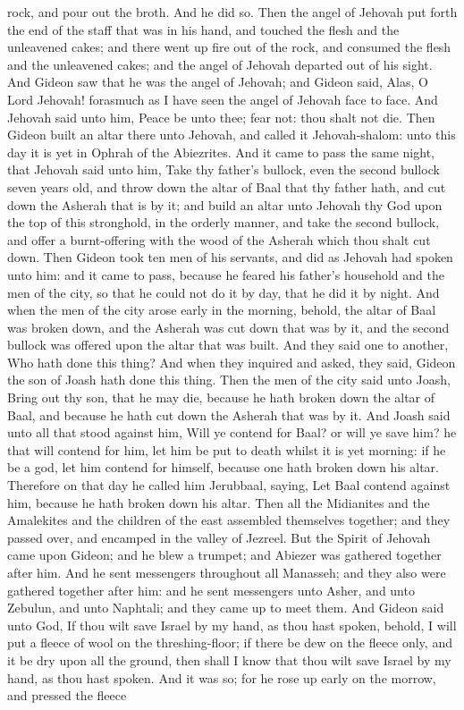 rock, and pour out the broth. And he did so. Then the angel of Jehovah put forth the end of the staff that was in his hand, and touched the flesh and the unleavened cakes; and there went up fire out of the rock, and consumed the flesh and the unleavened cakes; and the angel of Jehovah departed out of his sight. And Gideon saw that he was the angel of Jehovah; and Gideon said, Alas, O Lord Jehovah! forasmuch as I have seen the angel of Jehovah face to face. And Jehovah said unto him, Peace be unto thee; fear not: thou shalt not die. Then Gideon built an altar there unto Jehovah, and called it Jehovah-shalom: unto this day it is yet in Ophrah of the Abiezrites.  And it came to pass the same night, that Jehovah said unto him, Take thy father’s bullock, even the second bullock seven years old, and throw down the altar of Baal that thy father hath, and cut down the Asherah that is by it; and build an altar unto Jehovah thy God upon the top of this stronghold, in the orderly manner, and take the second bullock, and offer a burnt-offering with the wood of the Asherah which thou shalt cut down. Then Gideon took ten men of his servants, and did as Jehovah had spoken unto him: and it came to pass, because he feared his father’s household and the men of the city, so that he could not do it by day, that he did it by night.  And when the men of the city arose early in the morning, behold, the altar of Baal was broken down, and the Asherah was cut down that was by it, and the second bullock was offered upon the altar that was built. And they said one to another, Who hath done this thing? And when they inquired and asked, they said, Gideon the son of Joash hath done this thing. Then the men of the city said unto Joash, Bring out thy son, that he may die, because he hath broken down the altar of Baal, and because he hath cut down the Asherah that was by it. And Joash said unto all that stood against him, Will ye contend for Baal? or will ye save him? he that will contend for him, let him be put to death whilst it is yet morning: if he be a god, let him contend for himself, because one hath broken down his altar. Therefore on that day he called him Jerubbaal, saying, Let Baal contend against him, because he hath broken down his altar.  Then all the Midianites and the Amalekites and the children of the east assembled themselves together; and they passed over, and encamped in the valley of Jezreel. But the Spirit of Jehovah came upon Gideon; and he blew a trumpet; and Abiezer was gathered together after him. And he sent messengers throughout all Manasseh; and they also were gathered together after him: and he sent messengers unto Asher, and unto Zebulun, and unto Naphtali; and they came up to meet them.  And Gideon said unto God, If thou wilt save Israel by my hand, as thou hast spoken, behold, I will put a fleece of wool on the threshing-floor; if there be dew on the fleece only, and it be dry upon all the ground, then shall I know that thou wilt save Israel by my hand, as thou hast spoken. And it was so; for he rose up early on the morrow, and pressed the fleece 